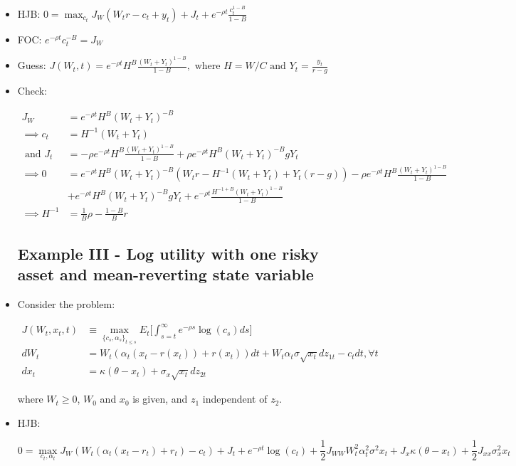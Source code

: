 \documentclass{article}
\begin{document}
\begin{itemize}
\item HJB: $0 = \max_{c_t} J_W(W_tr - c_t + y_t) + J_t + e^{-\rho t} \frac{c_t^{1-B}}{1-B}$

\item FOC: $e^{-\rho t} c_t^{-B} = J_W$

\item Guess: $J(W_t, t) = e^{-\rho t} H^B \frac{(W_t + Y_t)^{1-B}}{1-B}, \text{ where } H = W/C \text{ and } Y_t = \frac{y_t}{r -g}$

\item Check: 

\begin{align*}
J_W &= e^{-\rho t} H^B (W_t + Y_t)^{-B} \\
\implies c_t &= H^{-1} (W_t + Y_t) \\
\text{ and } J_t &= -\rho e^{-\rho t} H^B \frac{(W_t + Y_t)^{1-B}}{1 - B}  + \rho e^{-\rho t} H^B (W_t + Y_t)^{-B}gY_t \\
\implies 0 &= e^{-\rho t} H^B (W_t+Y_t)^{-B}(W_t r - H^{-1} (W_t+Y_t) + Y_t(r-g)) - \rho e^{-\rho t} H^B \frac{(W_t + Y_t)^{1-B}}{1-B} \\
&+ e^{-\rho t} H^{B} (W_t + Y_t)^{-B}gY_t + e^{-\rho t} \frac{H^{-1+B} (W_t + Y_t)^{1-B}}{1 - B} \\
\implies
H^{-1} &= \frac{1}{B} \rho - \frac{1 - B}{B} r
\end{align*}

\subsection*{Example III - Log utility with one risky asset and mean-reverting state variable}

\item Consider the problem:

\begin{align*}
J(W_t, x_t, t) &\equiv \max_{\{c_s, \alpha_s\}_{t \le s}} E_t \Bigg[ \int_{s=t}^\infty e^{-\rho s} \log(c_s) ds \Bigg] \\
dW_t &= W_t(\alpha_t(x_t - r(x_t)) + r(x_t)) dt + W_t \alpha_t \sigma \sqrt{x_t} dz_{1t} - c_t dt, \forall t \\
dx_t &= \kappa (\theta - x_t) + \sigma_x \sqrt{x_t} dz_{2t}
\end{align*}

where $W_t \ge 0$, $W_0$ and $x_0$ is given, and $z_1$ independent of $z_2$.

\item HJB: 

$$
0 = \max_{c_t, \alpha_t} J_W(W_t (\alpha_t(x_t - r_t) + r_t) - c_t) + J_t + e^{-\rho t} \log(c_t) + \frac{1}{2} J_{WW} W_t^2 \alpha_t^2 \sigma^2 x_t + J_x \kappa(\theta - x_t) + \frac{1}{2} J_{xx} \sigma_x^2 x_t
$$


\end{itemize}
\end{document}
